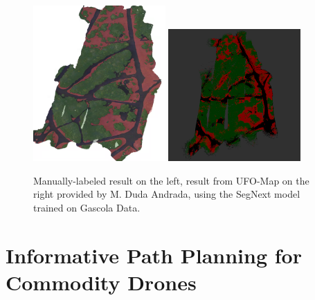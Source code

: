 \begin{figure}
    \centering
    \includegraphics[width=0.45\textwidth]{figs/results/semantic_mapping/labeled_orthomoasaic.png}
    \includegraphics[width=0.45\textwidth]{figs/results/semantic_mapping/segnext_gc5_ufomap.png}
    \caption{Manually-labeled result on the left, result from UFO-Map on the right provided by M. Duda Andrada, using the SegNext model trained on Gascola Data.}
    \label{fig:results:semantic_map_UFO}
\end{figure}


\section{Informative Path Planning for Commodity Drones}

